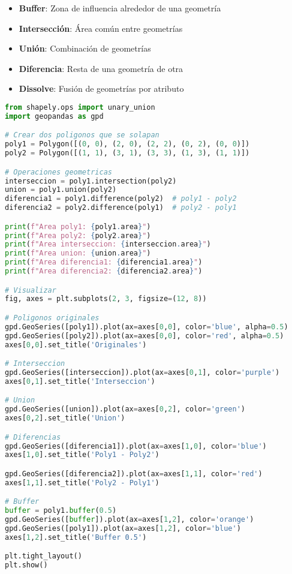 \documentclass[11pt,a4paper]{article}
\newcommand{\concepto}[2]{\begin{tcolorbox}[colback=blue!5,colframe=usachblue,title={#1}]#2\end{tcolorbox}}
\begin{document}
\concepto{Operaciones Fundamentales}{
\begin{itemize}
    \item \textbf{Buffer}: Zona de influencia alrededor de una geometría
    \item \textbf{Intersección}: Área común entre geometrías
    \item \textbf{Unión}: Combinación de geometrías
    \item \textbf{Diferencia}: Resta de una geometría de otra
    \item \textbf{Dissolve}: Fusión de geometrías por atributo
\end{itemize}
}

\begin{lstlisting}[language=Python]
from shapely.ops import unary_union
import geopandas as gpd

# Crear dos poligonos que se solapan
poly1 = Polygon([(0, 0), (2, 0), (2, 2), (0, 2), (0, 0)])
poly2 = Polygon([(1, 1), (3, 1), (3, 3), (1, 3), (1, 1)])

# Operaciones geometricas
interseccion = poly1.intersection(poly2)
union = poly1.union(poly2)
diferencia1 = poly1.difference(poly2)  # poly1 - poly2
diferencia2 = poly2.difference(poly1)  # poly2 - poly1

print(f"Area poly1: {poly1.area}")
print(f"Area poly2: {poly2.area}")
print(f"Area interseccion: {interseccion.area}")
print(f"Area union: {union.area}")
print(f"Area diferencia1: {diferencia1.area}")
print(f"Area diferencia2: {diferencia2.area}")

# Visualizar
fig, axes = plt.subplots(2, 3, figsize=(12, 8))

# Poligonos originales
gpd.GeoSeries([poly1]).plot(ax=axes[0,0], color='blue', alpha=0.5)
gpd.GeoSeries([poly2]).plot(ax=axes[0,0], color='red', alpha=0.5)
axes[0,0].set_title('Originales')

# Interseccion
gpd.GeoSeries([interseccion]).plot(ax=axes[0,1], color='purple')
axes[0,1].set_title('Interseccion')

# Union
gpd.GeoSeries([union]).plot(ax=axes[0,2], color='green')
axes[0,2].set_title('Union')

# Diferencias
gpd.GeoSeries([diferencia1]).plot(ax=axes[1,0], color='blue')
axes[1,0].set_title('Poly1 - Poly2')

gpd.GeoSeries([diferencia2]).plot(ax=axes[1,1], color='red')
axes[1,1].set_title('Poly2 - Poly1')

# Buffer
buffer = poly1.buffer(0.5)
gpd.GeoSeries([buffer]).plot(ax=axes[1,2], color='orange')
gpd.GeoSeries([poly1]).plot(ax=axes[1,2], color='blue')
axes[1,2].set_title('Buffer 0.5')

plt.tight_layout()
plt.show()
\end{lstlisting}
\end{document}
